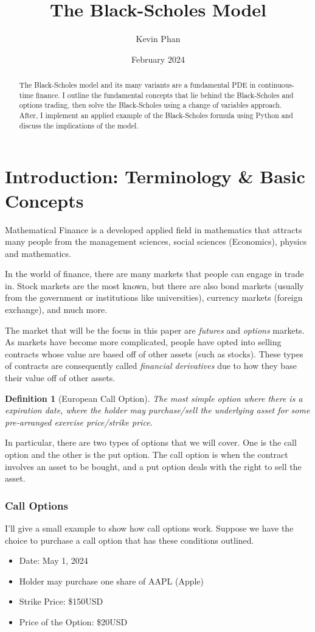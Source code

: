 \documentclass{article}
\title{The Black-Scholes Model}
\author{Kevin Phan}
\date{February 2024}
\newtheorem{definition}{Definition}[section]
\begin{document}
\maketitle

\begin{abstract}
    The Black-Scholes model and its many variants are a fundamental PDE in 
    continuous-time finance. I outline the fundamental concepts that lie behind the Black-Scholes and options trading, 
    then solve the Black-Scholes using a change of variables approach. 
    After, I implement an applied example of the Black-Scholes formula using Python and discuss the implications of the model. 
\end{abstract}

\section{Introduction: Terminology \& Basic Concepts}

Mathematical Finance is a developed applied field in mathematics that attracts many people from the management sciences, social sciences (Economics), physics and mathematics.

In the world of finance, there are many markets that people can engage in trade in. Stock markets are the most known, 
but there are also bond markets (usually from the government or institutions like universities), currency markets (foreign exchange), and much more. 

The market that will be the focus in this paper are \emph{futures} and \emph{options} markets. As markets have become more complicated, people have 
opted into selling contracts whose value are based off of other assets (such as stocks). These types of contracts are consequently called \emph{financial derivatives}
due to how they base their value off of other assets. 


 
\begin{definition}[European Call Option]
The most simple option where there is a expiration date, 
where the holder may purchase/sell the underlying asset for some pre-arranged exercise price/strike price.
\end{definition}
In particular, there are two types of options that we will cover. One is the call option and the other is the put option. The call option is when the contract involves an asset to be bought,
and a put option deals with the right to sell the asset.

\subsubsection*{Call Options}
I'll give a small example to show how call options work. 
Suppose we have the choice to purchase a call option that has these conditions outlined.
\begin{itemize}
\item Date: May 1, 2024 
\item Holder may purchase one share of AAPL (Apple)
\item Strike Price: \$150USD
\item Price of the Option: \$20USD
\end{itemize}
\end{document}
